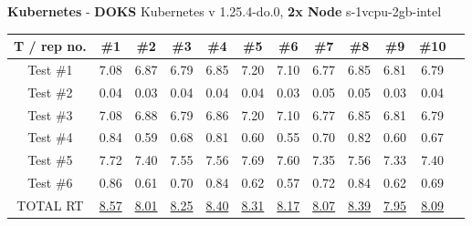 \newline
\textbf{Kubernetes} - \textbf{DOKS} Kubernetes v 1.25.4-do.0, \textbf{2x Node} s-1vcpu-2gb-intel
\newline
\begin{tabular}{ |c|c|c|c|c|c|c|c|c|c|c|c| } 
    \hline
    T / rep no. & \#1 & \#2& \#3& \#4& \#5& \#6& \#7& \#8& \#9& \#10 \\
    \hline
    Test \#1 & 7.08 & 6.87& 6.79& 6.85& 7.20& 7.10& 6.77& 6.85& 6.81& 6.79 \\ 
    Test \#2 & 0.04 & 0.03& 0.04& 0.04& 0.04& 0.03& 0.05& 0.05& 0.03& 0.04 \\ 
    Test \#3 & 7.08 & 6.88& 6.79& 6.86& 7.20& 7.10& 6.77& 6.85& 6.81& 6.79 \\ 
    Test \#4 & 0.84 & 0.59& 0.68& 0.81& 0.60& 0.55& 0.70& 0.82& 0.60& 0.67 \\ 
    Test \#5 & 7.72 & 7.40& 7.55& 7.56& 7.69& 7.60& 7.35& 7.56& 7.33& 7.40 \\ 
    Test \#6 & 0.86 & 0.61& 0.70& 0.84& 0.62& 0.57& 0.72& 0.84& 0.62& 0.69 \\ 
    TOTAL RT & \underline{8.57} & \underline{8.01}& \underline{8.25}& \underline{8.40}& \underline{8.31}& \underline{8.17}& \underline{8.07}& \underline{8.39}& \underline{7.95}& \underline{8.09} \\ 
    \hline
\end{tabular}
